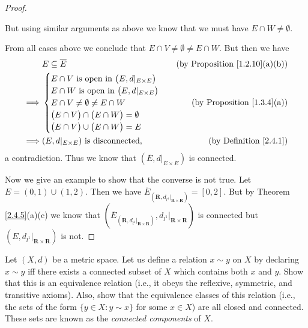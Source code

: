 \begin{proof}
\begin{itemize}
              But using similar arguments as above we know that we must have \(E \cap W \neq \emptyset\).
    \end{itemize}
    From all cases above we conclude that \(E \cap V \neq \emptyset \neq E \cap W\).
    But then we have
    \begin{align*}
                 & E \subseteq \overline{E}                      & \text{(by Proposition \ref{1.2.10}(a)(b))} \\
        \implies & \begin{cases}
            E \cap V \text{ is open in } \big(E, d|_{E \times E}\big) \\
            E \cap W \text{ is open in } \big(E, d|_{E \times E}\big) \\
            E \cap V \neq \emptyset \neq E \cap W                     \\
            \big(E \cap V\big) \cap \big(E \cap W\big) = \emptyset    \\
            \big(E \cap V\big) \cup \big(E \cap W\big) = E
        \end{cases}                    & \text{(by Proposition \ref{1.3.4}(a))}     \\
        \implies & (E, d|_{E \times E}) \text{ is disconnected}, & \text{(by Definition \ref{2.4.1})}
    \end{align*}
    a contradiction.
    Thus we know that \((\overline{E}, d|_{\overline{E} \times \overline{E}})\) is connected.

    Now we give an example to show that the converse is not true.
    Let \(E = (0, 1) \cup (1, 2)\).
    Then we have \(\overline{E}_{(\mathbf{R}, d_{l^1}|_{\mathbf{R} \times \mathbf{R}})} = [0, 2]\).
    But by Theorem \ref{2.4.5}(a)(c) we know that \((\overline{E}_{(\mathbf{R}, d_{l^1}|_{\mathbf{R} \times \mathbf{R}})}, d_{l^1}|_{\mathbf{R} \times \mathbf{R}})\) is connected but \((E, d_{l^1}|_{\mathbf{R} \times \mathbf{R}})\) is not.
\end{proof}

\begin{exercise}\label{ex 2.4.9}
    Let \((X, d)\) be a metric space. Let us define a relation \(x \sim y\) on \(X\) by declaring \(x \sim y\) iff there exists a connected subset of \(X\) which contains both \(x\) and \(y\).
    Show that this is an equivalence relation (i.e., it obeys the reflexive, symmetric, and transitive axioms).
    Also, show that the equivalence classes of this relation (i.e., the sets of the form \(\{y \in  X : y \sim x\}\) for some \(x \in X\)) are all closed and connected.
    These sets are known as the \emph{connected components} of \(X\).
\end{exercise}


